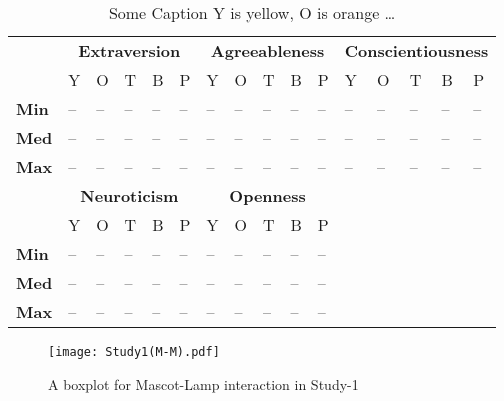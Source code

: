 \begin{table}[H]
    \renewcommand{\arraystretch}{1.2}
    \caption{Some Caption Y is yellow, O is orange \ldots}
    \label{table:medianMM1}
    \begin{center}
        \begin{tabular}{p{}|
        p{}|p{}|p{}|p{}|p{}||
        p{}|p{}|p{}|p{}|p{}||
        p{}|p{}|p{}|p{}|p{}|}
            \cline{2-16}
            & \multicolumn{5}{c||}{\textbf{Extraversion}} & \multicolumn{5}{c||}{\textbf{Agreeableness}}
            & \multicolumn{5}{c|}{\textbf{Conscientiousness}} \\
            \cline{2-16}
            & Y & O & T & B & P 			    & Y & O & T & B & P  	 	& Y & O & T & B & P     \\
            \cline{2-16}
            \textbf{Min}  	& -- & -- & -- & -- & -- 		& -- & -- & -- & -- & --  	& -- & -- & -- & -- & --  \\
            \textbf{Med} 	& -- & -- & -- & -- & -- 		& -- & -- & -- & -- & --  	& -- & -- & -- & -- & --  \\
            \textbf{Max}	& -- & -- & -- & -- & -- 		& -- & -- & -- & -- & --  	& -- & -- & -- & -- & -- \\
            \cline{2-16}
            \cline{2-11}
            &  \multicolumn{5}{|c||}{\textbf{Neuroticism}} & \multicolumn{5}{|c||}{\textbf{Openness}} \\
            \cline{2-11}
            & Y & O & T & B & P 			& Y & O & T & B & P    		\\
            \cline{2-11}
            \textbf{Min} 	& -- & -- & -- & -- & -- 		& -- & -- & -- & -- & -- 	\\
            \textbf{Med}    & -- & -- & -- & -- & -- 	    & -- & -- & -- & -- & -- 	\\
            \textbf{Max}  	& -- & -- & -- & -- & -- 		& -- & -- & -- & -- & --  	\\
            \cline{2-11}
        \end{tabular}
    \end{center}
\end{table}

\begin{figure}[H]
    \centering
    \texttt{[image: Study1(M-M).pdf]}
    \caption{A boxplot for Mascot-Lamp interaction in Study-1}
    \label{fig:MM1}
\end{figure}

